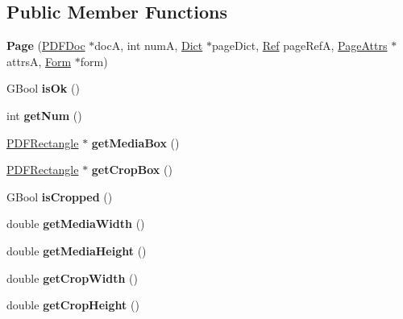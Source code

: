 \subsection*{Public Member Functions}
\begin{DoxyCompactItemize}
\item 
\mbox{\label{class_page_ae5f1657245c2e3c8f10c600c565020c1}} 
{\bfseries Page} (\hyperlink{class_p_d_f_doc}{P\+D\+F\+Doc} $\ast$docA, int numA, \hyperlink{class_dict}{Dict} $\ast$page\+Dict, \hyperlink{struct_ref}{Ref} page\+RefA, \hyperlink{class_page_attrs}{Page\+Attrs} $\ast$attrsA, \hyperlink{class_form}{Form} $\ast$form)
\item 
\mbox{\label{class_page_afc2ecefd9dc00ed4dcdf51f65d3e5502}} 
G\+Bool {\bfseries is\+Ok} ()
\item 
\mbox{\label{class_page_a485faa2efd51f177a88bc3688a5e40ac}} 
int {\bfseries get\+Num} ()
\item 
\mbox{\label{class_page_a6f391782741b431a6e7893758b425072}} 
\hyperlink{class_p_d_f_rectangle}{P\+D\+F\+Rectangle} $\ast$ {\bfseries get\+Media\+Box} ()
\item 
\mbox{\label{class_page_a582a58bc6150081c99e6aabf96171b5b}} 
\hyperlink{class_p_d_f_rectangle}{P\+D\+F\+Rectangle} $\ast$ {\bfseries get\+Crop\+Box} ()
\item 
\mbox{\label{class_page_a39e751ad673e63757c30eaab1fb79cfb}} 
G\+Bool {\bfseries is\+Cropped} ()
\item 
\mbox{\label{class_page_a42bee153352183c35eb12ebb76912349}} 
double {\bfseries get\+Media\+Width} ()
\item 
\mbox{\label{class_page_ad6c48efd60cd7594b0fa3e6517ba980b}} 
double {\bfseries get\+Media\+Height} ()
\item 
\mbox{\label{class_page_a7330e8d4fd407df642c2b53d62b4735f}} 
double {\bfseries get\+Crop\+Width} ()
\item 
\mbox{\label{class_page_a18e0592caa6cec9f85ea012eb184a283}} 
double {\bfseries get\+Crop\+Height} ()

\end{DoxyCompactItemize}
